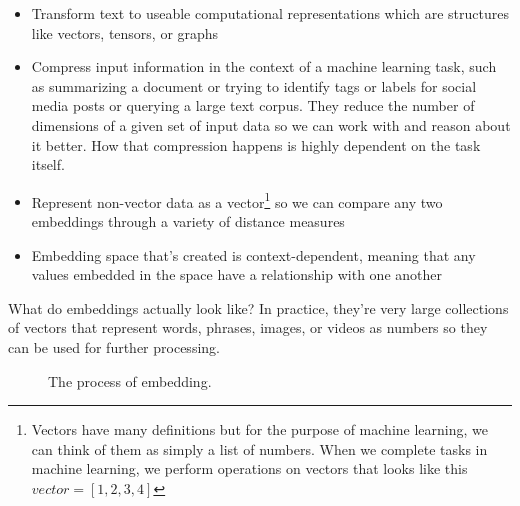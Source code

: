 \documentclass[11pt]{diazessay} %
\begin{document}
\begin{itemize}
   \item Transform text to useable computational representations which are structures like vectors, tensors, or graphs\citep{rao2019natural}
  \item Compress input information in the context of a machine learning task, such as summarizing a document or trying to identify tags or labels for social media posts or querying a large text corpus. They reduce the number of dimensions of a given set of input data so we can work with and reason about it better. How that compression happens is highly dependent on the task itself. 
  \item Represent non-vector data as a vector\footnote{Vectors have many definitions but for the purpose of machine learning, we can think of them as simply a list of numbers.  When we complete tasks in machine learning, we perform operations on vectors  that looks like this $vector = [1,2,3,4]$  } so we can compare any two embeddings through a variety of distance measures
  \item Embedding space that's created is context-dependent, meaning that any values embedded in the space have a relationship with one another
\end{itemize}

What do embeddings actually look like? In practice, they’re very large collections of vectors that represent  words, phrases, images, or videos as numbers so they can be used for further processing.   

\begin{figure}[!ht]
    \centering
    \caption{The process of embedding.}
    \label{fig:embedding}
\end{figure}
\end{document}
